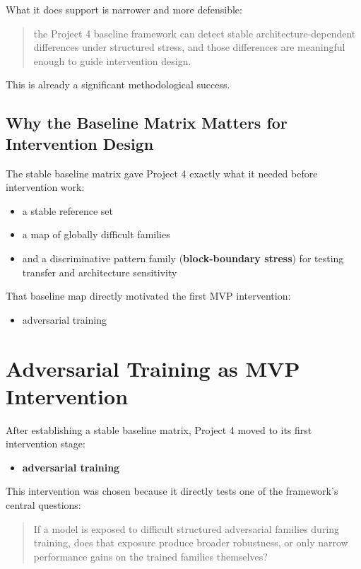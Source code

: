 \documentclass[11pt]{article}
\begin{document}
What it does support is narrower and more defensible:

\begin{quote}
the Project 4 baseline framework can detect stable architecture-dependent differences under structured stress, and those differences are meaningful enough to guide intervention design.
\end{quote}

This is already a significant methodological success.

\subsection{Why the Baseline Matrix Matters for Intervention Design}

The stable baseline matrix gave Project 4 exactly what it needed before intervention work:
\begin{itemize}[leftmargin=1.5em]
    \item a stable reference set
    \item a map of globally difficult families
    \item and a discriminative pattern family (\textbf{block-boundary stress}) for testing transfer and architecture sensitivity
\end{itemize}

That baseline map directly motivated the first MVP intervention:
\begin{itemize}[leftmargin=1.5em]
    \item adversarial training
\end{itemize}

\section{Adversarial Training as MVP Intervention}

After establishing a stable baseline matrix, Project 4 moved to its first intervention stage:
\begin{itemize}[leftmargin=1.5em]
    \item \textbf{adversarial training}
\end{itemize}

This intervention was chosen because it directly tests one of the framework's central questions:

\begin{quote}
If a model is exposed to difficult structured adversarial families during training, does that exposure produce broader robustness, or only narrow performance gains on the trained families themselves?
\end{quote}
\end{document}
